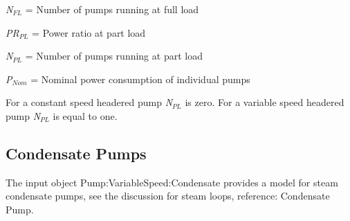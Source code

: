 \emph{N\(_{FL}\)} = Number of pumps running at full load

\emph{PR\(_{PL}\)} = Power ratio at part load

\emph{N\(_{PL}\)} = Number of pumps running at part load

\emph{P\(_{Nom}\)} = Nominal power consumption of individual pumps

For a constant speed headered pump \emph{N\(_{PL}\)} is zero. For a variable speed headered pump \emph{N\(_{PL}\)} is equal to one.

\subsection{Condensate Pumps}\label{condensate-pumps}

The input object Pump:VariableSpeed:Condensate provides a model for steam condensate pumps, see the discussion for steam loops, reference: Condensate Pump.
